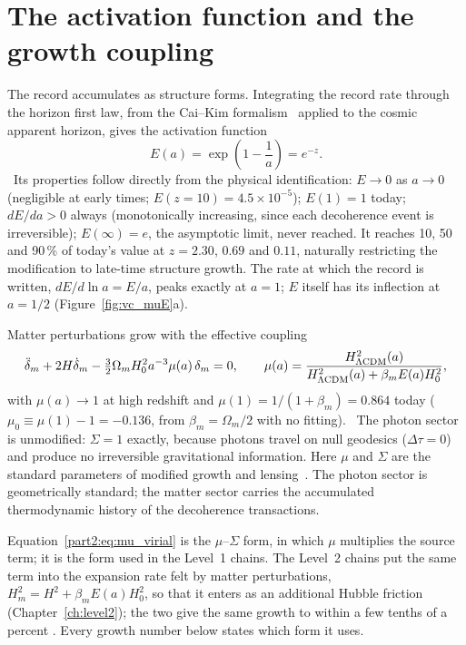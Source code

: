 \section{The activation function and the growth coupling}\label{sec:vc_activation}
The record accumulates as structure forms. Integrating the record rate through the horizon first law, from the Cai--Kim formalism~\cite{CaiKim2005} applied
to the cosmic apparent horizon, gives the activation function
\begin{equation}
E(a)=\exp\!\left(1-\frac1a\right)=e^{-z}.\label{eq:vc_E}
\end{equation}
\derived\ Its properties follow directly from the physical identification: $E\to0$ as $a\to0$ (negligible at early times; $E(z{=}10)=4.5\times10^{-5}$); $E(1)=1$
today; $dE/da>0$ always (monotonically increasing, since each decoherence event is irreversible); $E(\infty)=e$, the asymptotic limit, never reached. It
reaches 10, 50 and 90\,\% of today's value at $z=2.30$, $0.69$ and $0.11$, naturally restricting the modification to late-time structure growth. The rate at
which the record is written, $dE/d\ln a=E/a$, peaks exactly at $a=1$; $E$ itself has its inflection at $a=1/2$ (Figure~\ref{fig:vc_muE}a). \calc

Matter perturbations grow with the effective coupling
\begin{equation}
\ddot\delta_m+2H\dot\delta_m-\tfrac32\Omega_mH_0^2a^{-3}\mu(a)\,\delta_m=0,\qquad
\mu(a)=\frac{H^2_{\Lambda{\rm CDM}}(a)}{H^2_{\Lambda{\rm CDM}}(a)+\beta_mE(a)H_0^2},\label{part2:eq:mu_virial}
\end{equation}
with $\mu(a)\to1$ at high redshift and $\mu(1)=1/(1+\beta_m)=0.864$ today ($\mu_0\equiv\mu(1)-1=-0.136$, from $\beta_m=\Omega_m/2$ with no fitting).
\derived\ The photon sector is unmodified: $\Sigma=1$ exactly, because photons travel on null geodesics ($\Delta\tau=0$) and produce no irreversible
gravitational information. Here $\mu$ and $\Sigma$ are the standard parameters of modified growth and lensing~\cite{BertschingerZukin2008}. The photon sector
is geometrically standard; the matter sector carries the accumulated thermodynamic history of the decoherence transactions.

Equation~\eqref{part2:eq:mu_virial} is the $\mu$--$\Sigma$ form, in which $\mu$ multiplies the source term; it is the form used in the Level~1 chains. The
Level~2 chains put the same term into the expansion rate felt by matter perturbations, $H_m^2=H^2+\beta_mE(a)H_0^2$, so that it enters as an additional
Hubble friction (Chapter~\ref{ch:level2}); the two give the same growth to within a few tenths of a percent \calc. Every growth number below states which form it
uses.

